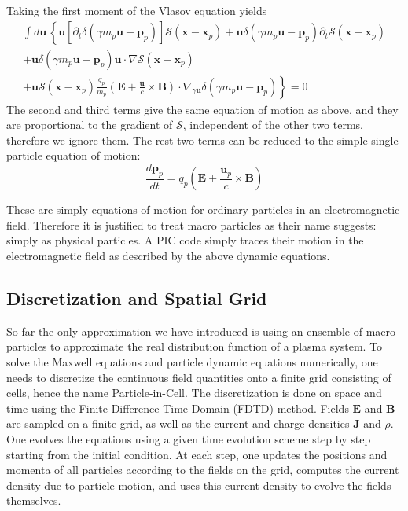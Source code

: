 Taking the first moment of the Vlasov equation yields
\begin{equation}
\begin{split}
    \int d\mathbf{u}\,\left\{ \mathbf{u}\left[ \partial_t \delta(\gamma m_{p}\mathbf{u} - \mathbf{p}_p) \right]\mathcal{S}(\mathbf{x} - \mathbf{x}_p) + \mathbf{u}\delta(\gamma m_{p}\mathbf{u} - \mathbf{p}_p)\partial_t\mathcal{S}(\mathbf{x} - \mathbf{x}_p) \right. \\
    + \mathbf{u}\delta(\gamma m_{p}\mathbf{u} - \mathbf{p}_p) \mathbf{u}\cdot\nabla \mathcal{S}(\mathbf{x} - \mathbf{x}_p) \\
    \left. + \mathbf{u}\mathcal{S}(\mathbf{x} - \mathbf{x}_p)\frac{q_p}{m_p}\left(\mathbf{E} + \frac{\mathbf{u}}{c}\times \mathbf{B}\right)\cdot \nabla_{\gamma \mathbf{u}}\delta(\gamma m_{p}\mathbf{u} - \mathbf{p}_p) \right\} = 0
\end{split}
\end{equation}
The second and third terms give the same equation of motion as above, and they
are proportional to the gradient of $\mathcal{S}$, independent of the other two terms,
therefore we ignore them. The rest two terms can be reduced to the simple
single-particle equation of motion:
\begin{equation}
  \label{eq:eom-momentum}
\frac{d\mathbf{p}_p}{dt} = q_p\left(\mathbf{E} + \frac{\mathbf{u}_{p}}{c}\times \mathbf{B} \right)
\end{equation}

These are simply equations of motion for ordinary particles in an
electromagnetic field. Therefore it is justified to treat macro particles as
their name suggests: simply as physical particles. A PIC code simply traces their
motion in the electromagnetic field as described by the above dynamic equations.


\subsection{Discretization and Spatial Grid}
\label{sec:discretization}

So far the only approximation we have introduced is using an ensemble of macro
particles to approximate the real distribution function of a plasma system. To
solve the Maxwell equations and particle dynamic equations numerically, one
needs to discretize the continuous field quantities onto a finite grid
consisting of cells, hence the name Particle-in-Cell. The discretization is done
on space and time using the Finite Difference Time Domain (FDTD)
method. %
Fields $\mathbf{E}$ and $\mathbf{B}$ are sampled on a finite grid, as well as
the current and charge densities $\mathbf{J}$ and $\rho$. One evolves the
equations using a given time evolution scheme step by step starting from the
initial condition. At each step, one updates the positions and momenta of all
particles according to the fields on the grid, computes the current density due
to particle motion, and uses this current density to evolve the fields
themselves.

